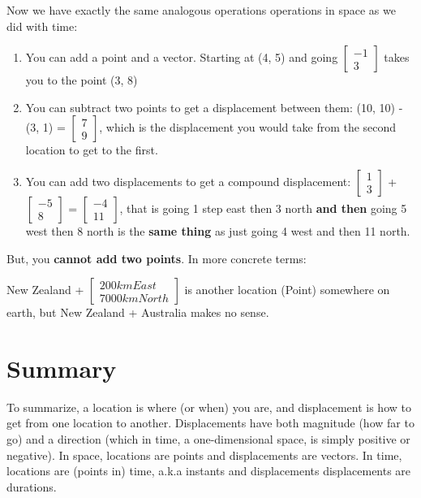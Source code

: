 \documentclass[12pt]{article}
\begin{document}
Now we have exactly the same analogous operations operations in space as we did with time:

\begin{enumerate}
    \item You can add a point and a vector. Starting at (4, 5) and going $\begin{bmatrix} -1 \\ 3 \end{bmatrix}$ takes you to the point (3, 8)
    \item You can subtract two points to get a displacement between them: (10, 10) - (3, 1) = $\begin{bmatrix} 7 \\ 9 \end{bmatrix}$, which is the displacement you would take from the second location to get to the first.
    \item You can add two displacements to get a compound displacement: $\begin{bmatrix} 1 \\ 3 \end{bmatrix}$ + $\begin{bmatrix} -5 \\ 8 \end{bmatrix}$ = $\begin{bmatrix} -4 \\ 11 \end{bmatrix}$, that is going 1 step east then 3 north \textbf{and then} going 5 west then 8 north is the \textbf{same thing} as just going 4 west and then 11 north.

\end{enumerate}

But, you \textbf{cannot add two points}. In more concrete terms:

New Zealand + $\begin{bmatrix} 200km East \\ 7000km North \end{bmatrix}$ is another location (Point) somewhere on earth, but New Zealand + Australia makes no sense.

\section{Summary}

To summarize, a location is where (or when) you are, and displacement is how to get from one location to another. Displacements have both magnitude (how far to go) and a direction (which in time, a one-dimensional space, is simply positive or negative). In space, locations are points and displacements are vectors. In time, locations are (points in) time, a.k.a instants and displacements displacements are durations.
\end{document}

